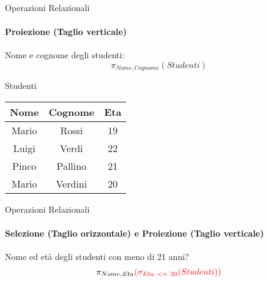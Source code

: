     \begin{frame}{Operazioni Relazionali}
        \framesubtitle{Proiezione (Taglio verticale)}
        Nome e cognome degli studenti:
        \[\pi_{Nome,Cognome} (Studenti)\]
                    \begin{center}
                        {\small Studenti}
                        
                        \begin{tabular}{|c|c|c|}
                            \hline
                            \rowcolor{cyan!30}Nome & Cognome & Eta \\
                            \hline
                            \cellcolor{red}Mario & \cellcolor{red}Rossi & 19 \\ \hline
                            \cellcolor{red}Luigi & \cellcolor{red}Verdi & 22 \\ \hline
                            \cellcolor{red}Pinco & \cellcolor{red}Pallino & 21 \\ \hline
                            \cellcolor{red}Mario & \cellcolor{red}Verdini & 20 \\ \hline
                            \end{tabular}
                    
                    \end{center}
    \end{frame}
    \begin{frame}{Operazioni Relazionali}
        \framesubtitle{Selezione (Taglio orizzontale) e Proiezione (Taglio verticale)}
        Nome ed et\`a degli studenti con meno di 21 anni?
        \[\pi_{Nome,Eta}\color{red}({\sigma_{Eta~<=~20} (Studenti)})\]
    \end{frame}

